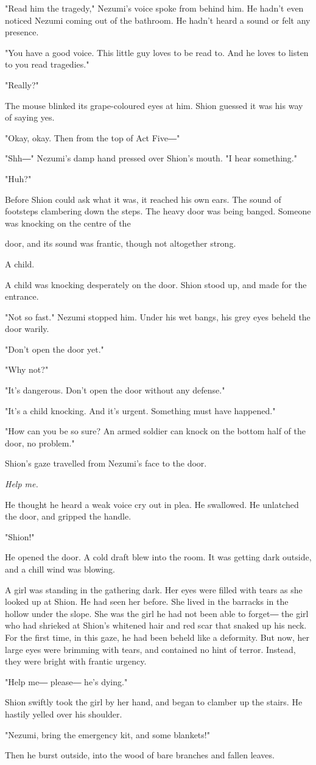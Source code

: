 "Read him the tragedy," Nezumi's voice spoke from behind him. He hadn't
even noticed Nezumi coming out of the bathroom. He hadn't heard a sound
or felt any presence.

"You have a good voice. This little guy loves to be read to. And he
loves to listen to you read tragedies."

"Really?"

The mouse blinked its grape-coloured eyes at him. Shion guessed it was
his way of saying yes.

"Okay, okay. Then from the top of Act Five―"

"Shh―" Nezumi's damp hand pressed over Shion's mouth. "I hear
something."

"Huh?"

Before Shion could ask what it was, it reached his own ears. The sound
of footsteps clambering down the steps. The heavy door was being banged.
Someone was knocking on the centre of the~

door, and its sound was frantic, though not altogether strong.

A child.

A child was knocking desperately on the door. Shion stood up, and made
for the entrance.

"Not so fast." Nezumi stopped him. Under his wet bangs, his grey eyes
beheld the door warily.

"Don't open the door yet."

"Why not?"

"It's dangerous. Don't open the door without any defense."

"It's a child knocking. And it's urgent. Something must have happened."

"How can you be so sure? An armed soldier can knock on the bottom half
of the door, no problem."

Shion's gaze travelled from Nezumi's face to the door.

\emph{Help me.}

He thought he heard a weak voice cry out in plea. He swallowed. He
unlatched the door, and gripped the handle.

"Shion!"

He opened the door. A cold draft blew into the room. It was getting dark
outside, and a chill wind was blowing.

A girl was standing in the gathering dark. Her eyes were filled with
tears as she looked up at Shion. He had seen her before. She lived in
the barracks in the hollow under the slope. She was the girl he had not
been able to forget― the girl who had shrieked at Shion's whitened hair
and red scar that snaked up his neck. For the first time, in this gaze,
he had been beheld like a deformity. But now, her large eyes were
brimming with tears, and contained no hint of terror. Instead, they were
bright with frantic urgency.~

"Help me― please― he's dying."

Shion swiftly took the girl by her hand, and began to clamber up the
stairs. He hastily yelled over his shoulder.

"Nezumi, bring the emergency kit, and some blankets!"

Then he burst outside, into the wood of bare branches and fallen leaves.